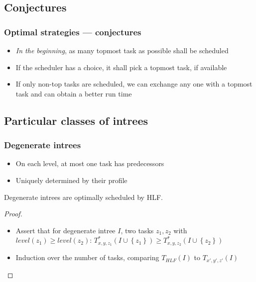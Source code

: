 \documentclass{beamer}
\begin{document}
\subsection{Conjectures}

\begin{frame}
  \frametitle{Optimal strategies --- conjectures}
  \begin{itemize}
  \item \emph{In the beginning}, as many topmost task as possible shall be scheduled
    
  \item If the scheduler has a choice, it shall pick a topmost task, if available
  \item If only non-top tasks are scheduled, we can exchange any one with a topmost task and can obtain a better run time
  \end{itemize}
\end{frame}

\subsection{Particular classes of intrees}

\begin{frame}
  \frametitle{Degenerate intrees}
  \begin{itemize}
  \item On each level, at most one task has predecessors
  \item Uniquely determined by their profile
  \end{itemize}
  \begin{theorem}
    Degenerate intrees are optimally scheduled by HLF.
  \end{theorem}
  \begin{proof}
    \begin{itemize}
    \item Assert that for degenerate intree $I$, two tasks $z_1, z_2$ with $level(z_1) \geq level(z_2)$: 
      $T^*_{x,y,z_1}(I \cup \left\{ z_1 \right\}) \geq
      T^*_{x,y,z_2}(I \cup \left\{ z_2 \right\})$
    \item Induction over the number of tasks, comparing $T_{HLF}(I)$ to $T_{x',y',z'}(I)$
    \end{itemize}
  \end{proof}
\end{frame}
\end{document}
